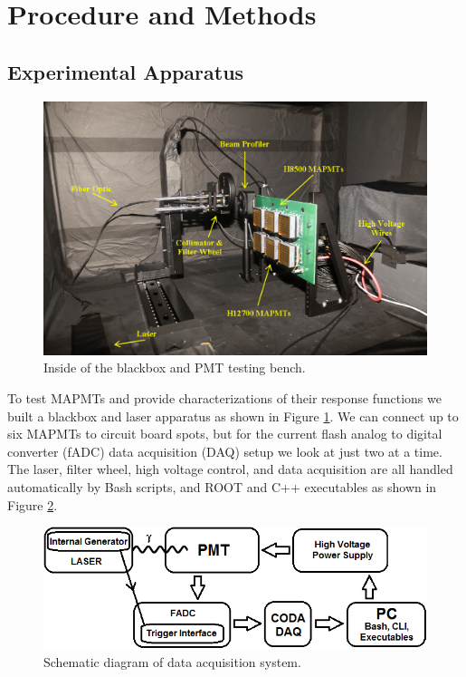 \documentclass[prc,twocolumn]{revtex4}
\begin{document}
\section{Procedure and Methods}

	\subsection{Experimental Apparatus}
	
		\begin{figure}
			\includegraphics[width=1.0\linewidth]{blackbox.png}
			\caption{Inside of the blackbox and PMT testing bench.}
			\label{blackbox}
		\end{figure}
		To test MAPMTs and provide characterizations of their response functions we built a blackbox and laser apparatus as shown in Figure \ref{blackbox}. We can connect up to six MAPMTs to circuit board spots, but for the current flash analog to digital converter (fADC) data acquisition (DAQ) setup we look at just two at a time. The laser, filter wheel, high voltage control, and data acquisition are all handled automatically by Bash scripts, and ROOT and C++ executables as shown in Figure \ref{schematic}.	
		\begin{figure}
			\includegraphics[width=1.0\linewidth]{schematic.png}
			\caption{Schematic diagram of data acquisition system.}
			\label{schematic}
		\end{figure}
\end{document}
